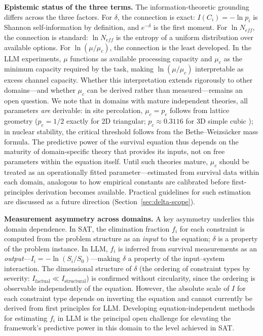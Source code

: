 \documentclass[11pt,a4paper]{article}
\begin{document}
\textbf{Epistemic status of the three terms.} The information-theoretic grounding differs across the three factors. For $\delta$, the connection is exact: $I(C_i) = -\ln p_i$ is Shannon self-information by definition, and $e^{-\delta}$ is the first moment. For $\ln N_{eff}$, the connection is standard: $\ln N_{eff}$ is the entropy of a uniform distribution over available options. For $\ln(\mu/\mu_c)$, the connection is the least developed. In the LLM experiments, $\mu$ functions as available processing capacity and $\mu_c$ as the minimum capacity required by the task, making $\ln(\mu/\mu_c)$ interpretable as excess channel capacity. Whether this interpretation extends rigorously to other domains---and whether $\mu_c$ can be derived rather than measured---remains an open question. We note that in domains with mature independent theories, all parameters \emph{are} derivable: in site percolation, $\mu_c = p_c$ follows from lattice geometry ($p_c = 1/2$ exactly for 2D triangular; $p_c \approx 0.3116$ for 3D simple cubic \citep{mertens2002exact}); in nuclear stability, the critical threshold follows from the Bethe--Weizs\"{a}cker mass formula. The predictive power of the survival equation thus depends on the maturity of domain-specific theory that provides its inputs, not on free parameters within the equation itself. Until such theories mature, $\mu_c$ should be treated as an operationally fitted parameter---estimated from survival data within each domain, analogous to how empirical constants are calibrated before first-principles derivation becomes available. Practical guidelines for such estimation are discussed as a future direction (Section~\ref{sec:delta-scope}).

\textbf{Measurement asymmetry across domains.} A key asymmetry underlies this domain dependence. In SAT, the elimination fraction $f_i$ for each constraint is computed from the problem structure as an \emph{input} to the equation; $\delta$ is a property of the problem instance. In LLM, $f_i$ is inferred from survival measurements as an \emph{output}---$I_i = -\ln(S_i/S_0)$---making $\delta$ a property of the input--system interaction. The dimensional structure of $\delta$ (the ordering of constraint types by severity: $I_{\text{factual}} \ll I_{\text{structural}}$) is confirmed without circularity, since the ordering is observable independently of the equation. However, the absolute scale of $I$ for each constraint type depends on inverting the equation and cannot currently be derived from first principles for LLM. Developing equation-independent methods for estimating $f_i$ in LLM is the principal open challenge for elevating the framework's predictive power in this domain to the level achieved in SAT.
\end{document}
